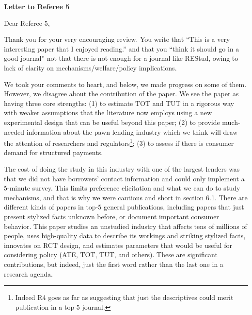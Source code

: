 \documentclass[11pt, colorinlistoftodos]{article} %
\begin{document}
\listoftodos

\noindent \textbf{Letter to Referee 5}
\vspace{.3in}

\noindent
Dear Referee 5,

Thank you for your very encouraging review. You write that ``This is a very interesting paper that I enjoyed reading.'' and that you ``think it should go in a good journal'' not that there is not enough for a journal like REStud, owing to lack of clarity on mechanisms/welfare/policy implications. 

We took your comments to heart, and below, we made progress on some of them. However, we disagree about the contribution of the paper. We see the paper as having three core strengths: (1) to estimate TOT and TUT in a rigorous way with weaker assumptions that the literature now employs using a new experimental design that can be useful beyond this paper; (2) to provide much-needed information about the pawn lending industry which we think will draw the attention of researchers and regulators\footnote{Indeed R4 goes as far as suggesting that just the descriptives could merit publication in a top-5 journal.}; (3) to assess if there is consumer demand for structured payments.

The cost of doing the study in this industry with one of the largest lenders was that we did not have borrowers' contact information and could only implement a 5-minute survey. This limits preference elicitation and what we can do to study mechanisms, and that is why we were cautious and short in section 6.1. There are different kinds of papers in top-5 general publications, including papers that just present stylized facts unknown before, or document important consumer behavior. This paper studies an unstudied industry that affects tens of millions of people, uses high-quality data to describe its workings and striking stylized facts, innovates on RCT design, and estimates parameters that would be useful for considering policy (ATE, TOT, TUT, and others). These are significant contributions, but indeed, just the first word rather than the last one in a research agenda.


\end{document}
